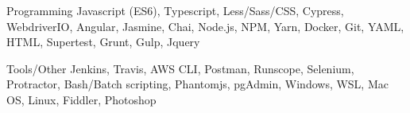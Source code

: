 

\begin{cvskills}

  \cvskill
    {Programming} %
    {Javascript (ES6), Typescript, Less/Sass/CSS, Cypress, WebdriverIO, Angular, Jasmine, Chai, Node.js, NPM, Yarn, Docker, Git, YAML, HTML, Supertest, Grunt, Gulp, Jquery} %

  \cvskill
    {Tools/Other} %
    {Jenkins, Travis, AWS CLI, Postman, Runscope, Selenium, Protractor, Bash/Batch scripting, Phantomjs, pgAdmin, Windows, WSL, Mac OS, Linux, Fiddler, Photoshop} %

\end{cvskills}
